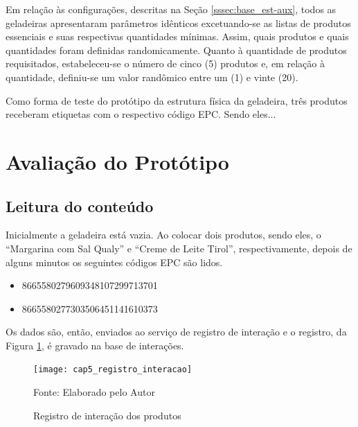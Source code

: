 Em relação às configurações, descritas na Seção \ref{sssec:base_est-aux}, todos as geladeiras apresentaram parâmetros idênticos excetuando-se as listas de produtos essenciais e suas respectivas quantidades mínimas. Assim, quais produtos e quais quantidades foram definidas randomicamente. Quanto à quantidade de produtos requisitados, estabeleceu-se o número de cinco (5) produtos e, em relação à quantidade, definiu-se um valor randômico entre um (1) e vinte (20).

Como forma de teste do protótipo da estrutura física da geladeira, três produtos receberam etiquetas com o respectivo código EPC. Sendo eles...


\section{Avaliação do Protótipo}

\subsection{Leitura do conteúdo}
 Inicialmente a geladeira está vazia.
 Ao colocar dois produtos, sendo eles, o ``Margarina com Sal Qualy'' e ``Creme de Leite Tirol'', respectivamente, depois de alguns minutos os seguintes códigos EPC são lidos.
 
 \begin{itemize} \parskip -3pt
     \item 8665580279609348107299713701
     \item 8665580277303506451141610373
 \end{itemize}
 
 Os dados são, então, enviados ao serviço de registro de interação e o registro, da Figura \ref{fig:cap5_registro_interacao}, é gravado na base de interações. 
 
 \begin{figure}[htb]
     \caption{Registro de interação dos produtos}
     \label{fig:cap5_registro_interacao}
     \texttt{[image: cap5\_registro\_interacao]}
     
     \footnotesize{Fonte: Elaborado pelo Autor}
 \end{figure}
 
